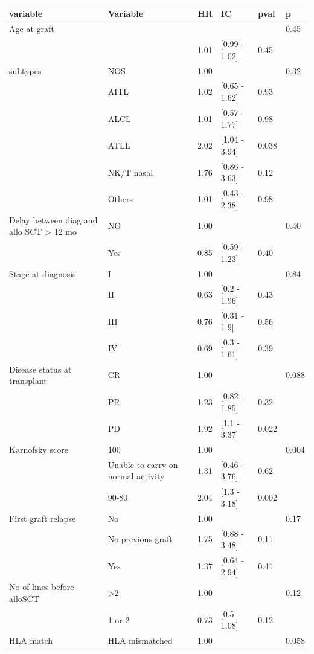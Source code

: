 \documentclass[a4paper,11pt] {article}
\begin{document}
\begin{center}
\begin{landscape}
\begin{longtable}{llrlll}
  \hline
variable & Variable & HR & IC & pval & p \\ 
  \hline
Age at graft &  &  &  &  & 0.45 \\ 
   &  & 1.01 & [0.99 - 1.02] & 0.45 &  \\ 
  subtypes & NOS & 1.00 &  &  & 0.32 \\ 
   & AITL & 1.02 & [0.65 - 1.62] & 0.93 &  \\ 
   & ALCL & 1.01 & [0.57 - 1.77] & 0.98 &  \\ 
   & ATLL & 2.02 & [1.04 - 3.94] & 0.038 &  \\ 
   & NK/T nasal & 1.76 & [0.86 - 3.63] & 0.12 &  \\ 
   & Others & 1.01 & [0.43 - 2.38] & 0.98 &  \\ 
  Delay between diag and allo SCT > 12 mo & NO & 1.00 &  &  & 0.40 \\ 
   & Yes & 0.85 & [0.59 - 1.23] & 0.40 &  \\ 
  Stage at diagnosis & I & 1.00 &  &  & 0.84 \\ 
   & II & 0.63 & [0.2 - 1.96] & 0.43 &  \\ 
   & III & 0.76 & [0.31 - 1.9] & 0.56 &  \\ 
   & IV & 0.69 & [0.3 - 1.61] & 0.39 &  \\ 
  Disease status at transplant & CR & 1.00 &  &  & 0.088 \\ 
   & PR & 1.23 & [0.82 - 1.85] & 0.32 &  \\ 
   & PD & 1.92 & [1.1 - 3.37] & 0.022 &  \\ 
  Karnofsky score & 100 & 1.00 &  &  & 0.004 \\ 
   & Unable to carry on normal activity & 1.31 & [0.46 - 3.76] & 0.62 &  \\ 
   & 90-80 & 2.04 & [1.3 - 3.18] & 0.002 &  \\ 
  First graft relapse & No & 1.00 &  &  & 0.17 \\ 
   & No previous graft & 1.75 & [0.88 - 3.48] & 0.11 &  \\ 
   & Yes & 1.37 & [0.64 - 2.94] & 0.41 &  \\ 
  No of lines before alloSCT & >2 & 1.00 &  &  & 0.12 \\ 
   & 1 or 2 & 0.73 & [0.5 - 1.08] & 0.12 &  \\ 
  HLA match & HLA mismatched & 1.00 &  &  & 0.058 \\ 

\end{longtable}
\end{landscape}
\end{center}
\end{document}
